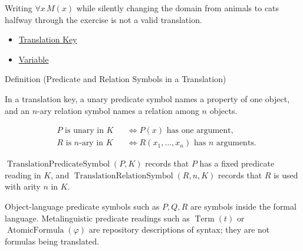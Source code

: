 \begin{remark*}
Writing \(\forall x\,M(x)\) while silently changing the domain from animals to
cats halfway through the exercise is not a valid translation.
\end{remark*}

\begin{dependencies}
\begin{itemize}
  \item \hyperref[def:translation-key-predicate-logic]{Translation Key}
  \item \hyperref[def:variable]{Variable}
\end{itemize}
\end{dependencies}

\begin{definitionbox}{Definition (Predicate and Relation Symbols in a Translation)}
\begin{definition}
\label{def:translation-predicate-relation-symbol}
In a translation key, a unary predicate symbol names a property of one object,
and an \(n\)-ary relation symbol names a relation among \(n\) objects.
\end{definition}
\end{definitionbox}

\begin{remark*}
\[
\begin{aligned}
&P \text{ is unary in }K &&\Longleftrightarrow P(x) \text{ has one argument,}\\
&R \text{ is }n\text{-ary in }K &&\Longleftrightarrow R(x_1,\ldots,x_n)
  \text{ has }n\text{ arguments.}
\end{aligned}
\]
\end{remark*}

\begin{remark*}
\(\operatorname{TranslationPredicateSymbol}(P,K)\) records that \(P\) has a
fixed predicate reading in \(K\), and \(\operatorname{TranslationRelationSymbol}(R,n,K)\)
records that \(R\) is used with arity \(n\) in \(K\).
\end{remark*}

\begin{remark*}[Interpretation]
Object-language predicate symbols such as \(P,Q,R\) are symbols inside the
formal language. Metalinguistic predicate readings such as
\(\operatorname{Term}(t)\) or \(\operatorname{AtomicFormula}(\varphi)\) are
repository descriptions of syntax; they are not formulas being translated.
\end{remark*}

